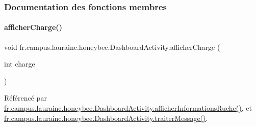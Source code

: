 \subsubsection{Documentation des fonctions membres}
\mbox{\label{classfr_1_1campus_1_1laurainc_1_1honeybee_1_1_dashboard_activity_a13e1d8016723e33b6245e9e3063c8a4f}} 
\paragraph{\texorpdfstring{afficher\+Charge()}{afficherCharge()}\hspace{0.1cm}{\footnotesize\ttfamily [1/2]}}
{\footnotesize\ttfamily void fr.\+campus.\+laurainc.\+honeybee.\+Dashboard\+Activity.\+afficher\+Charge (\begin{DoxyParamCaption}\item[{int}]{charge }\end{DoxyParamCaption})\hspace{0.3cm}{\ttfamily [private]}}



Référencé par \hyperlink{classfr_1_1campus_1_1laurainc_1_1honeybee_1_1_dashboard_activity_a88f00531bee33bd6c47b33f5ac4df9ed}{fr.\+campus.\+laurainc.\+honeybee.\+Dashboard\+Activity.\+afficher\+Informations\+Ruche()}, et \hyperlink{classfr_1_1campus_1_1laurainc_1_1honeybee_1_1_dashboard_activity_a50d4c14e993ff1779ae5dce8cee11216}{fr.\+campus.\+laurainc.\+honeybee.\+Dashboard\+Activity.\+traiter\+Message()}.


